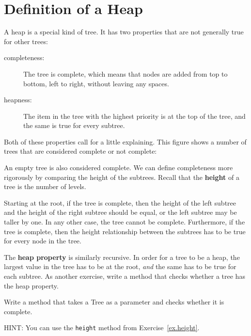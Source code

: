 \section{Definition of a Heap}

A heap is a special kind of tree.  It has two properties
that are not generally true for other trees:

\begin{description}

\item[completeness:] The tree is complete, which means that
nodes are added from top to bottom, left to right, without
leaving any spaces.

\item[heapness:] The item in the tree with the highest priority
is at the top of the tree, and the same is true for every subtree.

\end{description}

Both of these properties call for a little explaining.
This figure shows a number of trees that are considered
complete or not complete:
 
 
An empty tree is also considered complete.  We can define completeness
more rigorously by comparing the height of the subtrees.  Recall that
the {\bf height} of a tree is the number of levels.


Starting at the root, if the tree is complete, then the
height of the left subtree and the height of the right subtree
should be equal, or the left subtree may be taller by one.
In any other case, the tree cannot be complete.
Furthermore, if the tree is complete, then the height
relationship between the subtrees has to be true for every
node in the tree.


The {\bf heap property} is similarly recursive.  In order for a
tree to be a heap, the largest value in the tree has to be at
the root, {\em and} the same has to be true for each subtree.
As another exercise, write a method that checks whether a tree
has the heap property.

\begin{exercise}
Write a method that takes a Tree as a parameter and checks
whether it is complete.

HINT: You can use the {\tt height} method from Exercise~\ref{ex.height}.
\end{exercise}

